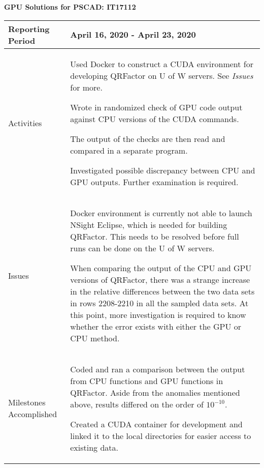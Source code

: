 \documentclass[11pt,letterpaper]{article}
\begin{document}
\vspace{.2in}
\begin{center}
    {\bf GPU Solutions for PSCAD: IT17112}
\end{center}

	\vspace{.25in}

\begin{tabular}{| p{} | p{} |}
	\hline
	Reporting Period & April 16, 2020 - April 23, 2020 \\ \hline

	Activities & \begin{enumerate*}
	\item[\tiny\textbullet] Used Docker to construct a CUDA environment for developing QRFactor on U of W servers. See \emph{Issues} for more. \newline
  \item[\tiny\textbullet] Wrote in randomized check of GPU code output against CPU versions of the CUDA commands. \newline
  \item[\tiny\textbullet] The output of the checks are then read and compared in a separate program. \newline
  \item[\tiny\textbullet] Investigated possible discrepancy between CPU and GPU outputs. Further examination is required.
	\end{enumerate*} \\ \hline

	Issues & \begin{enumerate*}
	\item[\tiny\textbullet] Docker environment is currently not able to launch NSight Eclipse, which is needed for building QRFactor. This needs to be resolved before full runs can be done on the U of W servers. \newline
  \item[\tiny\textbullet] When comparing the output of the CPU and GPU versions of QRFactor, there was a strange increase in the relative differences between the two data sets in rows 2208-2210 in all the sampled data sets. At this point, more investigation is required to know whether the error exists with either the GPU or CPU method.
	\end{enumerate*} \\ \hline

	Milestones \newline Accomplished & \begin{enumerate*}
	\item[\tiny\textbullet] Coded and ran a comparison between the output from CPU functions and GPU functions in QRFactor. Aside from the anomalies mentioned above, results differed on the order of $10^{-10}$. \newline
  \item[\tiny\textbullet] Created a CUDA container for development and linked it to the local directories for easier access to existing data.
  \end{enumerate*} \\ \hline


\end{tabular}
\end{document}
